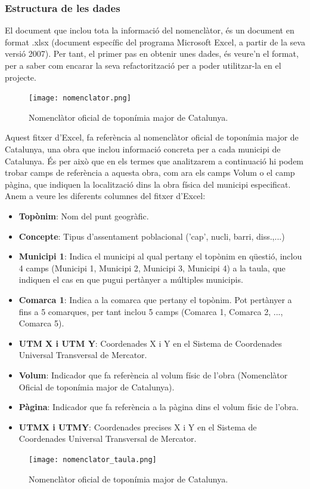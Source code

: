 \documentclass[12pt,a4paper,openright,oneside]{article}
\numberwithin{equation}{section}
\theoremstyle{definition}
\begin{document}
\subsubsection*{Estructura de les dades}
El document que inclou tota la informació del nomenclàtor, és un document en format .xlsx (document específic del programa Microsoft Excel, a partir de la seva versió 2007). Per tant, el primer pas en obtenir unes dades, és veure'n el format, per a saber com encarar la seva refactorització per a poder utilitzar-la en el projecte.
\newpage
\begin{figure}[htbp]
\centering
\texttt{[image: nomenclator.png]}
\caption{Nomenclàtor oficial de toponímia major de Catalunya.}
\end{figure}
Aquest fitxer d'Excel, fa referència al nomenclàtor oficial de toponímia major de Catalunya, una obra que inclou informació concreta per a cada municipi de Catalunya. És per això que en els termes que analitzarem a continuació hi podem trobar camps de referència a aquesta obra, com ara els camps Volum o el camp pàgina, que indiquen la localització dins la obra física del municipi especificat.\\
Anem a veure les diferents columnes del fitxer d'Excel:
\begin{itemize}
\item \textbf{Topònim}: Nom del punt geogràfic.
\item \textbf{Concepte}: Tipus d'assentament poblacional ('cap', nucli, barri, diss.,...)
\item \textbf{Municipi 1}: Indica el municipi al qual pertany el topònim en qüestió, inclou 4 camps (Municipi 1, Municipi 2, Municipi 3, Municipi 4) a la taula, que indiquen el cas en que pugui pertànyer a múltiples municipis.
\item \textbf{Comarca 1}: Indica a la comarca que pertany el topònim. Pot pertànyer a fins a 5 comarques, per tant inclou 5 camps (Comarca 1, Comarca 2, ..., Comarca 5).
\item \textbf{UTM X i UTM Y}: Coordenades X i Y en el Sistema de Coordenades Universal Transversal de Mercator.
\item \textbf{Volum}: Indicador que fa referència al volum físic de l'obra (Nomenclàtor Oficial de toponímia major de Catalunya).
\item \textbf{Pàgina}: Indicador que fa referència a la pàgina dins el volum físic de l'obra.
\item \textbf{UTMX i UTMY}: Coordenades precises X i Y en el Sistema de Coordenades Universal Transversal de Mercator.
\end{itemize}
\begin{figure}[htbp]
\centering
\texttt{[image: nomenclator\_taula.png]}
\caption{Nomenclàtor oficial de toponímia major de Catalunya.}
\end{figure}
\end{document}
